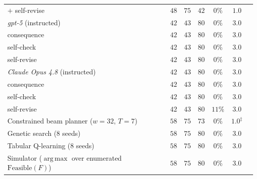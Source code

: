 \documentclass{article}
\newcommand{\Feas}{\mathrm{Feasible}}
\DeclareMathOperator*{\argmax}{arg\,max}
\begin{document}
\begin{table}[htbp]
{\begin{tabular}{@{}lcccccc@{}}
\quad $+$ self-revise                            & $48$ & $75$ & $42$ & $0\%$    & $1.0$ \\
\addlinespace[1pt]
\emph{gpt-5} (instructed)                         & $42$ & $43$ & $80$ & $0\%$    & $3.0$ \\
\quad consequence                                & $42$ & $43$ & $80$ & $0\%$    & $3.0$ \\
\quad self-check                                 & $42$ & $43$ & $80$ & $0\%$    & $3.0$ \\
\quad self-revise                                & $42$ & $43$ & $80$ & $0\%$    & $3.0$ \\
\addlinespace[1pt]
\emph{Claude Opus 4.8} (instructed)              & $42$ & $43$ & $80$ & $0\%$    & $3.0$ \\
\quad consequence                                & $42$ & $43$ & $80$ & $0\%$    & $3.0$ \\
\quad self-check                                 & $42$ & $43$ & $80$ & $0\%$    & $3.0$ \\
\quad self-revise                                & $42$ & $43$ & $80$ & $11\%$   & $3.0$ \\
\addlinespace[1pt]
Constrained beam planner ($w=32$, $T=7$) & $58$ & $75$ & $73$ & $0\%$ & $1.0^{\ddagger}$ \\
Genetic search (8 seeds)              & $58$ & $75$ & $80$ & $0\%$ & $3.0$ \\
Tabular Q-learning (8 seeds)          & $58$ & $75$ & $80$ & $0\%$ & $3.0$ \\
Simulator ($\argmax$ over enumerated $\Feas(F)$) & $58$ & $75$ & $80$ & $0\%$ & $3.0$ \\
\bottomrule
\end{tabular}}
\end{table}
\fi
\end{document}
